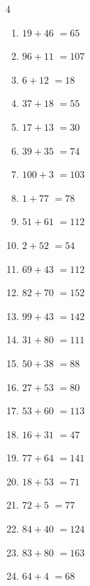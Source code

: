 \begin{multicols}{4}
\begin{enumerate}
  \item $19+46$
        $=65$

  \item $96+11$
        $=107$

  \item $6+12$
        $=18$

  \item $37+18$
        $=55$

  \item $17+13$
        $=30$

  \item $39+35$
        $=74$

  \item $100+3$
        $=103$

  \item $1+77$
        $=78$

  \item $51+61$
        $=112$

  \item $2+52$
        $=54$

  \item $69+43$
        $=112$

  \item $82+70$
        $=152$

  \item $99+43$
        $=142$

  \item $31+80$
        $=111$

  \item $50+38$
        $=88$

  \item $27+53$
        $=80$

  \item $53+60$
        $=113$

  \item $16+31$
        $=47$

  \item $77+64$
        $=141$

  \item $18+53$
        $=71$

  \item $72+5$
        $=77$

  \item $84+40$
        $=124$

  \item $83+80$
        $=163$

  \item $64+4$
        $=68$


\end{enumerate}
\end{multicols}
